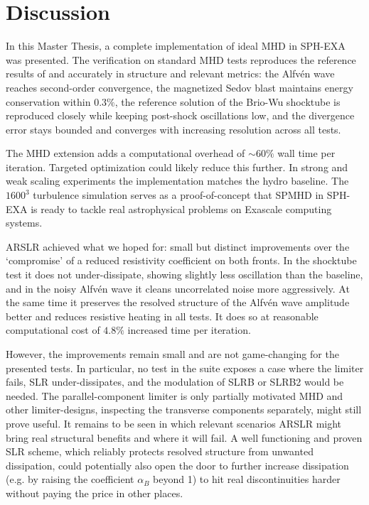 \section{Discussion}
\label{sec:discussion}

In this Master Thesis, a complete implementation of ideal MHD in SPH-EXA was presented. The verification on standard MHD tests reproduces the reference results of \cite{WissingShen2020} and \cite{Price2018} accurately in structure and relevant metrics: the Alfvén wave reaches second-order convergence, the magnetized Sedov blast maintains energy conservation within $0.3\%$, the reference solution of the Brio-Wu shocktube is reproduced closely while keeping post-shock oscillations low, and the divergence error stays bounded and converges with increasing resolution across all tests. 

The MHD extension adds a computational overhead of $\sim 60\%$ wall time per iteration. Targeted optimization could likely reduce this further. In strong and weak scaling experiments the implementation matches the hydro baseline. The $1600^3$ turbulence simulation serves as a proof-of-concept that SPMHD in SPH-EXA is ready to tackle real astrophysical problems on Exascale computing systems. 

ARSLR achieved what we hoped for: small but distinct improvements over the `compromise' of a reduced resistivity coefficient on both fronts. In the shocktube test it does not under-dissipate, showing slightly less oscillation than the baseline, and in the noisy Alfvén wave it cleans uncorrelated noise more aggressively. At the same time it preserves the resolved structure of the Alfvén wave amplitude better and reduces resistive heating in all tests. It does so at reasonable computational cost of $4.8\%$ increased time per iteration. 

However, the improvements remain small and are not game-changing for the presented tests. In particular, no test in the suite exposes a case where the limiter fails, SLR under-dissipates, and the modulation of SLRB or SLRB2 would be needed. The parallel-component limiter is only partially motivated MHD and other limiter-designs, inspecting the transverse components separately, might still prove useful. It remains to be seen in which relevant scenarios ARSLR might bring real structural benefits and where it will fail. A well functioning and proven SLR scheme, which reliably protects resolved structure from unwanted dissipation, could potentially also open the door to further increase dissipation (e.g. by raising the coefficient $\alpha_B$ beyond 1) to hit real discontinuities harder without paying the price in other places. 

